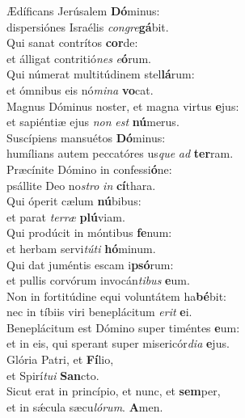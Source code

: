 \evenverse Ædíficans Jerúsalem \textbf{Dó}minus:~\*\\
\evenverse dispersiónes Israélis \textit{con}\textit{gre}\textbf{gá}bit.\\
\oddverse Qui sanat contrítos \textbf{cor}de:~\*\\
\oddverse et álligat contritió\textit{nes} \textit{e}\textbf{ó}rum.\\
\evenverse Qui númerat multitúdinem stel\textbf{lá}rum:~\*\\
\evenverse et ómnibus eis nó\textit{mi}\textit{na} \textbf{vo}cat.\\
\oddverse Magnus Dóminus noster, et magna virtus \textbf{e}jus:~\*\\
\oddverse et sapiéntiæ ejus \textit{non} \textit{est} \textbf{nú}merus.\\
\evenverse Suscípiens mansuétos \textbf{Dó}minus:~\*\\
\evenverse humílians autem peccatóres us\textit{que} \textit{ad} \textbf{ter}ram.\\
\oddverse Præcínite Dómino in confessi\textbf{ó}ne:~\*\\
\oddverse psállite Deo no\textit{stro} \textit{in} \textbf{cí}thara.\\
\evenverse Qui óperit cælum \textbf{nú}bibus:~\*\\
\evenverse et parat \textit{ter}\textit{ræ} \textbf{plú}viam.\\
\oddverse Qui prodúcit in móntibus \textbf{fe}num:~\*\\
\oddverse et herbam servi\textit{tú}\textit{ti} \textbf{hó}minum.\\
\evenverse Qui dat juméntis escam i\textbf{psó}rum:~\*\\
\evenverse et pullis corvórum invocán\textit{ti}\textit{bus} \textbf{e}um.\\
\oddverse Non in fortitúdine equi voluntátem ha\textbf{bé}bit:~\*\\
\oddverse nec in tíbiis viri beneplácitum \textit{e}\textit{rit} \textbf{e}i.\\
\evenverse Beneplácitum est Dómino super timéntes \textbf{e}um:~\*\\
\evenverse et in eis, qui sperant super misericór\textit{di}\textit{a} \textbf{e}jus.\\
\oddverse Glória Patri, et \textbf{Fí}lio,~\*\\
\oddverse et Spirí\textit{tu}\textit{i} \textbf{San}cto.\\
\evenverse Sicut erat in princípio, et nunc, et \textbf{sem}per,~\*\\
\evenverse et in sǽcula sæcu\textit{ló}\textit{rum}. \textbf{A}men.\\
